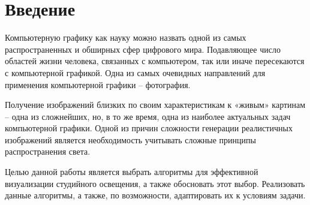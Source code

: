 \chapter*{Введение}

Компьютерную графику как науку можно назвать одной из самых распространенных и обширных сфер цифрового мира. Подавляющее число областей жизни человека, связанных с компьютером, так или иначе пересекаются с компьютерной графикой. Одна из самых очевидных направлений для применения компьютерной графики – фотография.

Получение изображений близких по своим характеристикам к «живым» картинам – одна из сложнейших, но, в то же время, одна из наиболее актуальных задач компьютерной графики. Одной из причин сложности генерации реалистичных изображений является необходимость учитывать сложные принципы распространения света.

Целью данной работы является выбрать алгоритмы для эффективной визуализации студийного освещения, а также обосновать этот выбор. Реализовать данные алгоритмы, а также, по возможности, адаптировать их к условиям задачи.  